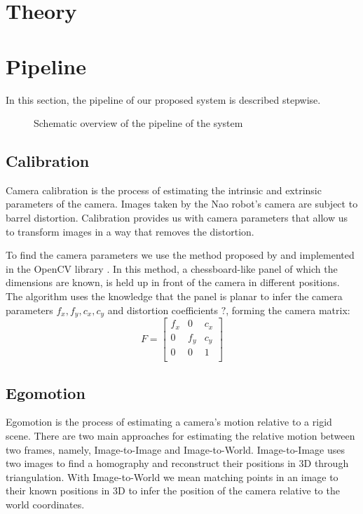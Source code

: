 \documentclass[a4paper]{article}
\begin{document}
\section{Theory}

\section{Pipeline}
In this section, the pipeline of our proposed system is described stepwise.

\begin{figure}[!hb]
\centerline{
}
\caption{Schematic overview of the pipeline of the system}
\label{fig:system}
\end{figure}

\subsection{Calibration}
Camera calibration is the process of estimating the intrinsic and extrinsic
parameters of the camera. Images taken by the Nao robot's camera are subject to
barrel distortion. Calibration provides us with camera parameters that allow us
to transform images in a way that removes the distortion.
\par
To find the camera parameters we use the method proposed by
\cite{zhang1999flexible} and implemented in the OpenCV library
\citep{opencv_library}. In this method, a chessboard-like panel of which the
dimensions are known, is held up in front of the camera in different positions.
The algorithm uses the knowledge that the panel is planar to infer the camera
parameters $f_x, f_y, c_x, c_y$ and distortion coefficients $?$, forming the
camera matrix:
$$
F =
\begin{bmatrix}
	f_x	& 0		& c_x\\
	0		& f_y		& c_y\\
	0		& 0		& 1\\
\end{bmatrix}
$$


\subsection{Egomotion}
Egomotion is the process of estimating a camera's motion relative to a rigid
scene. There are two main approaches for estimating the relative motion between
two frames, namely, Image-to-Image and Image-to-World. Image-to-Image uses two
images to find a homography and reconstruct their positions in 3D through
triangulation. With Image-to-World we mean matching points in an image to their
known positions in 3D to infer the position of the camera relative to the world
coordinates.
\end{document}
